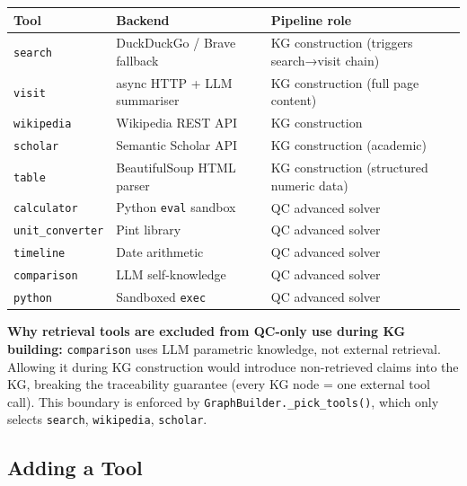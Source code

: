 \documentclass[11pt,a4paper]{article}
\begin{document}
\begin{tabular}{lll}
\toprule
\textbf{Tool} & \textbf{Backend} & \textbf{Pipeline role} \\
\midrule
\texttt{search}          & DuckDuckGo / Brave fallback & KG construction (triggers search→visit chain) \\
\texttt{visit}           & async HTTP + LLM summariser & KG construction (full page content) \\
\texttt{wikipedia}       & Wikipedia REST API & KG construction \\
\texttt{scholar}         & Semantic Scholar API & KG construction (academic) \\
\texttt{table}           & BeautifulSoup HTML parser & KG construction (structured numeric data) \\
\texttt{calculator}      & Python \texttt{eval} sandbox & QC advanced solver \\
\texttt{unit\_converter} & Pint library & QC advanced solver \\
\texttt{timeline}        & Date arithmetic & QC advanced solver \\
\texttt{comparison}      & LLM self-knowledge & QC advanced solver \\
\texttt{python}          & Sandboxed \texttt{exec} & QC advanced solver \\
\bottomrule
\end{tabular}

\vspace{0.5em}
\textbf{Why retrieval tools are excluded from QC-only use during KG building:} \texttt{comparison} uses LLM parametric knowledge, not external retrieval. Allowing it during KG construction would introduce non-retrieved claims into the KG, breaking the traceability guarantee (every KG node = one external tool call). This boundary is enforced by \texttt{GraphBuilder.\_pick\_tools()}, which only selects \texttt{search}, \texttt{wikipedia}, \texttt{scholar}.

\subsection{Adding a Tool}
\end{document}
